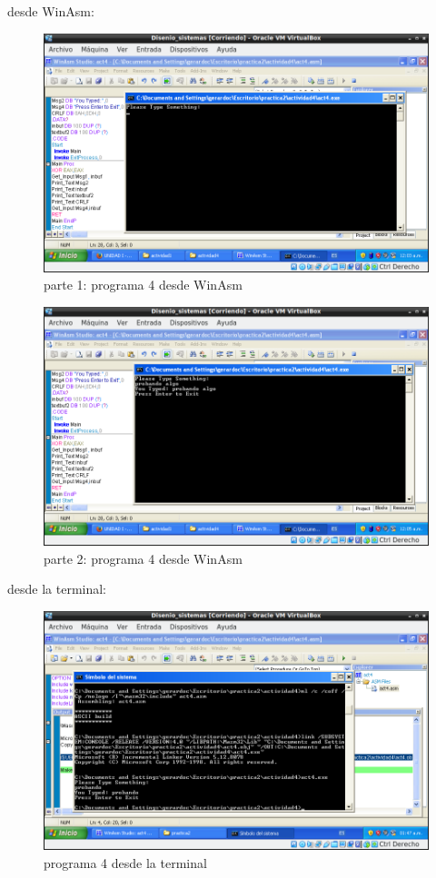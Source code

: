 desde WinAsm:
\begin{figure}[H]
  \includegraphics[width=\linewidth]{practica2/imagenes/ej4/ej4a.png}
  \caption{parte 1: programa 4 desde WinAsm}
\end{figure}

\begin{figure}[H]
  \includegraphics[width=\linewidth]{practica2/imagenes/ej4/ej4b.png}
  \caption{parte 2: programa 4 desde WinAsm}
\end{figure}

desde la terminal: 
\begin{figure}[H]
  \includegraphics[width=\linewidth]{practica2/imagenes/ej4/ej4_uzcategui_terminal.png}
  \caption{programa 4 desde la terminal}
\end{figure}


